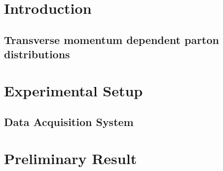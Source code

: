 \section{Introduction}
\subsection{Transverse momentum dependent parton distributions}
\section{Experimental Setup}
\subsection{Data Acquisition System}
\section{Preliminary Result }
